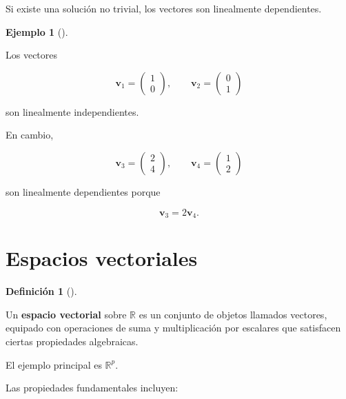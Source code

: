 \documentclass[
  spanish,
  10.5pt,
  letterpaper,
  DIV=11,
  numbers=noendperiod,
  oneside,
  open=any]{scrreprt}
\theoremstyle{definition}
\newtheorem{definition}{Definición}[chapter]
\theoremstyle{definition}
\newtheorem{example}{Ejemplo}[chapter]
\theoremstyle{plain}
\theoremstyle{remark}
\begin{document}
Si existe una solución no trivial, los vectores son linealmente
dependientes.

\begin{example}[]\protect\hypertarget{exm-independencia}{}\label{exm-independencia}

Los vectores

\[
\mathbf{v}_1=
\begin{pmatrix}
1\\
0
\end{pmatrix},
\qquad
\mathbf{v}_2=
\begin{pmatrix}
0\\
1
\end{pmatrix}
\]

son linealmente independientes.

En cambio,

\[
\mathbf{v}_3=
\begin{pmatrix}
2\\
4
\end{pmatrix},
\qquad
\mathbf{v}_4=
\begin{pmatrix}
1\\
2
\end{pmatrix}
\]

son linealmente dependientes porque

\[
\mathbf{v}_3=2\mathbf{v}_4.
\]

\end{example}

\section*{Espacios vectoriales}\label{espacios-vectoriales}


\begin{definition}[]\protect\hypertarget{def-espacio-vectorial}{}\label{def-espacio-vectorial}

Un \textbf{espacio vectorial} sobre \(\mathbb{R}\) es un conjunto de
objetos llamados vectores, equipado con operaciones de suma y
multiplicación por escalares que satisfacen ciertas propiedades
algebraicas.

\end{definition}

El ejemplo principal es \(\mathbb{R}^{p}\).

Las propiedades fundamentales incluyen:
\end{document}
